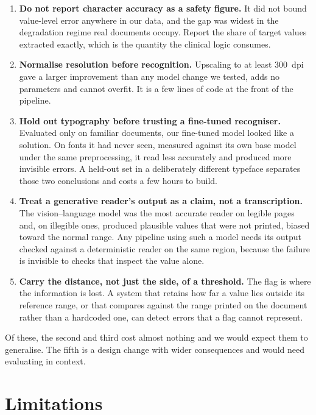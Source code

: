 \documentclass[11pt]{article}
\begin{document}
\begin{enumerate}
\item \textbf{Do not report character accuracy as a safety figure.} It did not bound value-level
error anywhere in our data, and the gap was widest in the degradation regime real documents
occupy. Report the share of target values extracted exactly, which is the quantity the clinical
logic consumes.

\item \textbf{Normalise resolution before recognition.} Upscaling to at least 300~dpi gave a
larger improvement than any model change we tested, adds no parameters and cannot overfit. It is
a few lines of code at the front of the pipeline.

\item \textbf{Hold out typography before trusting a fine-tuned recogniser.} Evaluated only on
familiar documents, our fine-tuned model looked like a solution. On fonts it had never seen,
measured against its own base model under the same preprocessing, it read less accurately and
produced more invisible errors. A held-out set in a deliberately
different typeface separates those two conclusions and costs a few hours to build.

\item \textbf{Treat a generative reader's output as a claim, not a transcription.} The
vision--language model was the most accurate reader on legible pages and, on illegible ones,
produced plausible values that were not printed, biased toward the normal range. Any pipeline
using such a model needs its output checked against a deterministic reader on the same region,
because the failure is invisible to checks that inspect the value alone.

\item \textbf{Carry the distance, not just the side, of a threshold.} The flag is where the
information is lost. A system that retains how far a value lies outside its reference range, or
that compares against the range printed on the document rather than a hardcoded one, can detect
errors that a flag cannot represent.
\end{enumerate}

Of these, the second and third cost almost nothing and we would expect them to generalise. The
fifth is a design change with wider consequences and would need evaluating in context.

\section{Limitations}
\end{document}
